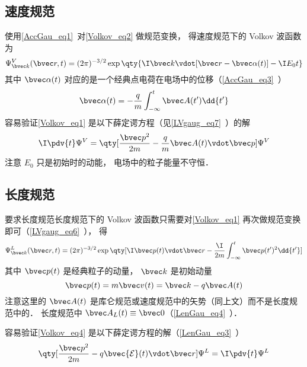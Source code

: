 \subsection{速度规范}
使用\autoref{AccGau_eq1}~对\autoref{Volkov_eq2} 做规范变换， 得速度规范下的 Volkov 波函数为
\begin{equation}\label{Volkov_eq1}
\Psi_{\bvec k}^V(\bvec r, t) = (2\pi)^{-3/2} \exp\qty{\I \bvec k \vdot [\bvec r - \bvec \alpha(t)] - \I E_0 t}
\end{equation}
其中 $\bvec \alpha(t)$ 对应的是一个经典点电荷在电场中的位移（\autoref{AccGau_eq3}~）
\begin{equation}
\bvec \alpha(t) = -\frac{q}{m} \int_{-\infty}^t \bvec A(t') \dd{t'}
\end{equation}
容易验证\autoref{Volkov_eq1} 是以下薛定谔方程（见\autoref{LVgaug_eq7}~）的解
\begin{equation}
\I \pdv{t} \Psi^V = \qty[\frac{\bvec p^2}{2m} - \frac{q}{m}\bvec A(t) \vdot \bvec p] \Psi^V
\end{equation}
注意 $E_0$ 只是初始时的动能， 电场中的粒子能量不守恒．

\subsection{长度规范}
要求长度规范长度规范下的 Volkov 波函数只需要对\autoref{Volkov_eq1} 再次做规范变换即可（\autoref{LVgaug_eq6}~）， 得
\begin{equation}\label{Volkov_eq4}
\Psi_{\bvec k}^L(\bvec r, t) = (2\pi)^{-3/2} \exp\qty[\I \bvec p(t)\vdot \bvec r - \frac{\I}{2m}\int_{-\infty}^t \bvec p(t')^2 \dd{t'}]
\end{equation}
其中 $\bvec p(t)$ 是经典粒子的动量， $\bvec k$ 是初始动量
\begin{equation}
\bvec p(t) = m\bvec v(t) = \bvec k - q\bvec A(t)
\end{equation}
注意这里的 $\bvec A(t)$ 是库仑规范或速度规范中的矢势（同上文）而不是长度规范中的． 长度规范中 $\bvec A_L(t) \equiv \bvec 0$（\autoref{LenGau_eq4}~）．

容易验证\autoref{Volkov_eq4} 是以下薛定谔方程的解（\autoref{LenGau_eq3}~）
\begin{equation}
\qty[\frac{\bvec p^2}{2m} - q \bvec {\mathcal E}(t) \vdot \bvec r] \Psi^L = \I \pdv{t} \Psi^L
\end{equation}
